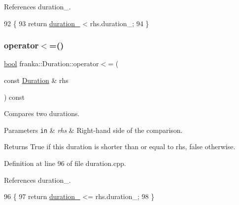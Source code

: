 References duration\+\_\+.


\begin{DoxyCode}
92                                                            \{
93   \textcolor{keywordflow}{return} \hyperlink{classfranka_1_1Duration_ae446c403b200f0dbf92fb51ca21e82ff}{duration\_} < rhs.duration\_;
94 \}
\end{DoxyCode}
\mbox{\label{classfranka_1_1Duration_ae4b9c8646fd50a2105d36f3848a5b949}} 
\subsubsection{\texorpdfstring{operator$<$=()}{operator<=()}}
{\footnotesize\ttfamily \hyperlink{classbool}{bool} franka\+::\+Duration\+::operator$<$= (\begin{DoxyParamCaption}\item[{const \hyperlink{classfranka_1_1Duration}{Duration} \&}]{rhs }\end{DoxyParamCaption}) const\hspace{0.3cm}{\ttfamily [noexcept]}}

Compares two durations.


\begin{DoxyParams}[1]{Parameters}
\mbox{\tt in}  & {\em rhs} & Right-\/hand side of the comparison.\\
\hline
\end{DoxyParams}
\begin{DoxyReturn}{Returns}
True if this duration is shorter than or equal to rhs, false otherwise. 
\end{DoxyReturn}


Definition at line 96 of file duration.\+cpp.



References duration\+\_\+.


\begin{DoxyCode}
96                                                             \{
97   \textcolor{keywordflow}{return} \hyperlink{classfranka_1_1Duration_ae446c403b200f0dbf92fb51ca21e82ff}{duration\_} <= rhs.duration\_;
98 \}
\end{DoxyCode}
\mbox{\label{classfranka_1_1Duration_adf2fec0c87fe1668e42f217ab029df19}} 
